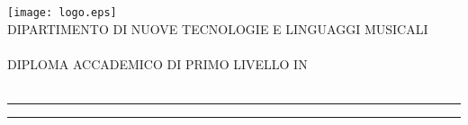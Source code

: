 
\begin{titlepage}
  \begin{center}
    {\LARGE
      \texttt{[image: logo.eps]} \\[0.5cm]

      {\normalsize{DIPARTIMENTO DI NUOVE TECNOLOGIE E LINGUAGGI MUSICALI}} \\[-0.2cm]
      {} \\[0.5cm]

      {\normalsize{DIPLOMA ACCADEMICO DI PRIMO LIVELLO IN}} \\[-0.2cm]
      {} \\[1.414cm]

      {\huge{\spacedlowsmallcaps{\myName}}}\vspace{-0.3cm}
      \par\noindent\rule{\textwidth}{0.4pt}\vspace{0.3cm}
      {\Huge{\color{bbari}\spacedallcaps{\myTitle}}}
      \par\noindent\rule{\textwidth}{0.4pt}\vspace{0.3cm}
      {\spacedlowsmallcaps{\mySubTitle}}
    }

    \vspace{2.718cm}


\end{center}
\end{titlepage}
